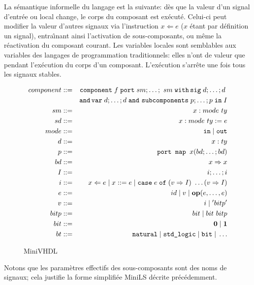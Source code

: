 \documentclass[a4paper]{article}
\newcommand{\minils}{{\sc MiniLS}}
\newcommand{\p}[0]{\; \vert \;}
\newcommand{\mybox}[1]{\mbox{\tt{#1}}}
\newcommand{\Coloneqq}[0]{::=}
\newcommand{\coloneqq}[0]{::=}
\newcommand{\Op}[2]{\mybox{\bf{op}}(#1,\dots,#2)}
\newcommand{\Assign}[2]{#1 \Leftarrow #2}
\newcommand{\Affect}[2]{#1 \coloneqq #2}
\newcommand{\Case}[5]{\mybox{case} \; #1 \; \mybox{of} \; (#2 \Rightarrow #3) \
  \dots (#4 \Rightarrow #5)}
\begin{document}
La s\'emantique informelle du langage est la suivante: d\`es que la valeur d'un
signal d'entr\'ee ou local change, le corps du composant est ex\'ecut\'e. Celui-ci
peut modifier la valeur d'autres signaux via l'instruction $x \Leftarrow e$ ($x$
\'etant par d\'efinition un signal), entra\^{\i}nant ainsi l'activation de
sous-composants, ou m\^eme la r\'eactivation du composant courant. Les variables
locales sont semblables aux variables des langages de programmation
traditionnels: elles n'ont de valeur que pendant l'ex\'ecution du corps d'un
composant. L'ex\'ecution s'arr\^ete une fois tous les signaux stables.

\begin{figure}[t]
  \centering
  \begin{eqnarray*}
    component & \Coloneqq & \mybox{component} \; f \; \mybox{port} \; sm;\dots;\
    sm \; \mybox{with} \, \mybox{sig} \; d; \dots; d \; \\
    & & \mybox{and} \, \mybox{var} \; d; \dots; d \; \mybox{and} \
    \mybox{subcomponents} \; p; \dots; p \; \mybox{in} \; I \\
    sm & \Coloneqq & x : mode \ ty \\
    sd & \Coloneqq & x : mode \ ty := e \\
    mode & \Coloneqq & \mybox{in} \p \mybox{out} \\
    d & \Coloneqq & x : ty \\
    p & \Coloneqq & \mybox{port map } x (bd;\dots;bd) \\
    bd & \Coloneqq & x \Rightarrow x \\
    I & \coloneqq & i; \dots; i \\
    i & \Coloneqq & \Assign{x}{e} \p \Affect{x}{e} \p \Case{e}{v}{I}{v}{I} \\
    e & \Coloneqq & id \; \vert \; v \; \vert \; \Op{e}{e} \\
    v & \Coloneqq & i \; \vert \; ' bitp ' \\
    bitp & \Coloneqq & bit \p bit \  bitp \\
    bit & \Coloneqq & \mathbf{0} \p \mathbf{1} \\
    bt & \Coloneqq & \mybox{natural} \p \mybox{std\_logic} \p \mybox{bit}
    \p \dots
  \end{eqnarray*}
  \caption{MiniVHDL}
  \label{fig:mvhdl}
\end{figure}

Notons que les param\`etres effectifs des sous-composants sont des noms de
signaux; cela justifie la forme simplifi\'ee \minils{} d\'ecrite pr\'ec\'edemment.
\end{document}
